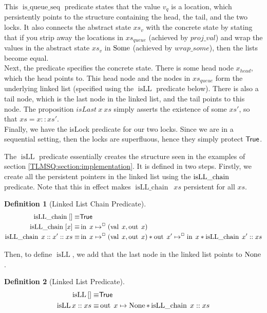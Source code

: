 \documentclass[twoside,11pt,openright]{report}
\newtheorem{definition}{Definition}[section]
\newcommand{\isqueueseq}{\operatorname{is\_queue\_seq}}
\newcommand{\isLLchain}[1]{\operatorname{isLL\_chain} \; #1}
\newcommand{\isLL}{\operatorname{isLL}}
\newcommand{\nIn}[1]{\operatorname{in} \; #1}
\newcommand{\nVal}[1]{\operatorname{val} \; #1}
\newcommand{\nOut}[1]{\operatorname{out} \; #1}
\begin{document}
This $\isqueueseq$ predicate states that the value $v_q$ is a location, which persistently points to the structure containing the head, the tail, and the two locks. It also connects the abstract state $xs_v$ with the concrete state by stating that if you strip away the locations in $xs_{queue}$ (achieved by $proj\_val$) and wrap the values in the abstract state $xs_v$ in $\operatorname{Some}$ (achieved by $wrap\_some$), then the lists become equal.\\
Next, the predicate specifies the concrete state. There is some head node $x_{head}$, which the head points to. This head node and the nodes in $xs_{queue}$ form the underlying linked list (specified using the $\isLL$ predicate below). There is also a tail node, which is the last node in the linked list, and the tail points to this node. The proposition $isLast\ x\ xs$ simply asserts the existence of some $xs'$, so that $xs = x :: xs'$.\\
Finally, we have the isLock predicate for our two locks. Since we are in a sequential setting, then the locks are superfluous, hence they simply protect $\textsf{True}$.

The $\isLL$ predicate essentially creates the structure seen in the examples of section \ref{TLMSQ:section:implementation}. It is defined in two steps. Firstly, we create all the persistent pointers in the linked list using the $\isLLchain$ predicate. Note that this in effect makes $\isLLchain \ xs$ persistent for all $xs$.
\begin{definition}[Linked List Chain Predicate]
  \begin{align*}
    \isLLchain{[]} \equiv& \TRUE\\
    \isLLchain{[x]} \equiv& \nIn{x} \mapsto^{\persistently} (\nVal{x}, \nOut{x})\\
    \isLLchain{x :: x' :: xs} \equiv& \nIn{x} \mapsto^{\persistently} (\nVal{x}, \nOut{x}) \star \nOut{x'} \mapsto^{\persistently} \nIn{x} \star \isLLchain{x' :: xs}
  \end{align*}
\end{definition}

Then, to define $\isLL$, we add that the last node in the linked list points to $\operatorname{None}$.
\begin{definition}[Linked List Predicate]
  \begin{align*}
    \isLL{[]} \equiv& \TRUE\\
    \isLL{x :: xs} \equiv& \nOut{x} \mapsto \None \star \isLLchain{x :: xs}
  \end{align*}
\end{definition}
\end{document}
